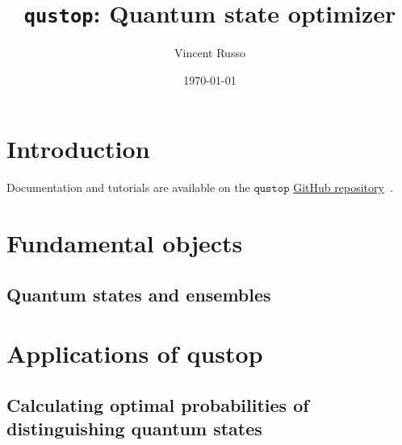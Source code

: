 \documentclass[nofootinbib,superscriptaddress,a4paper,twocolumn,longbibliography,floatfix,pra]{revtex4-2}
\def\qustop{\texttt{qustop}}
\begin{document}
\title{\qustop: Quantum state optimizer}

\author{Vincent Russo}
\affiliation{-}

\date{\today}

\begin{abstract}
\end{abstract}

\maketitle

\section{Introduction}
\label{sec:introduction}

Documentation and tutorials are available on the $\qustop$
\href{https://github.com/vprusso/toqito}{GitHub repository}~\cite{toqito}.


\section{Fundamental objects}
\label{sec:fundemental_objects}

\subsection{Quantum states and ensembles}\label{sec:ensembles}


\section{Applications of qustop}
\label{sec:applications}

\subsection{Calculating optimal probabilities of distinguishing quantum states}\label{sec:opt_dist}
\end{document}
